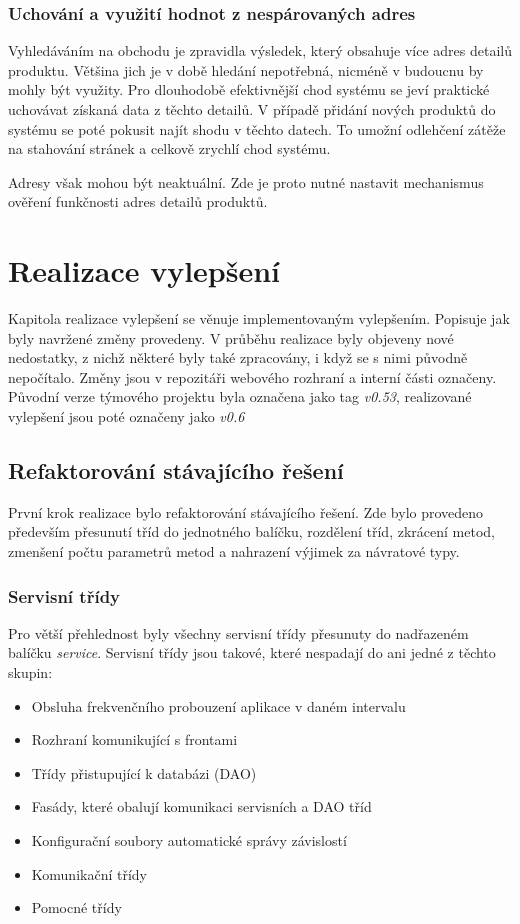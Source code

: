 \documentclass[thesis=B,czech]{FITthesis}[2012/06/26]
\begin{document}
\subsection{Uchování a využití hodnot z nespárovaných adres}
Vyhledáváním na obchodu je zpravidla výsledek, který obsahuje více adres detailů produktu. Většina jich je v době hledání nepotřebná, nicméně v budoucnu by mohly být využity. 
Pro dlouhodobě efektivnější chod systému se jeví praktické uchovávat získaná data z těchto detailů.
V případě přidání nových produktů do systému se poté pokusit najít shodu v těchto datech. To umožní odlehčení zátěže
na stahování stránek a celkově zrychlí chod systému.
\par
Adresy však mohou být neaktuální. Zde je proto nutné nastavit mechanismus ověření funkčnosti adres detailů produktů.


\chapter{Realizace vylepšení}
Kapitola realizace vylepšení se věnuje implementovaným vylepšením. Popisuje jak byly navržené změny provedeny.
V průběhu realizace byly objeveny nové nedostatky, z nichž některé byly také zpracovány, i když se s nimi původně nepočítalo.
Změny jsou v repozitáři webového rozhraní a interní části označeny. Původní verze týmového projektu byla označena jako
tag \textit{v0.53}, realizované vylepšení jsou poté označeny jako \textit{v0.6}

\section{Refaktorování stávajícího řešení}
První krok realizace bylo refaktorování stávajícího řešení. Zde bylo provedeno především přesunutí tříd do jednotného balíčku, 
rozdělení tříd, zkrácení metod, zmenšení počtu parametrů metod a nahrazení výjimek za návratové typy.

\subsection{Servisní třídy}
Pro větší přehlednost byly všechny servisní třídy přesunuty do nadřazeném balíčku \textit{service}. 
Servisní třídy jsou takové, které nespadají do ani jedné z těchto skupin:

\begin{itemize}
\item Obsluha frekvenčního probouzení aplikace v daném intervalu
\item Rozhraní komunikující s frontami
\item Třídy přistupující k databázi (DAO)
\item Fasády, které obalují komunikaci servisních a DAO tříd
\item Konfigurační soubory automatické správy závislostí
\item Komunikační třídy
\item Pomocné třídy
\end{itemize}
\end{document}

